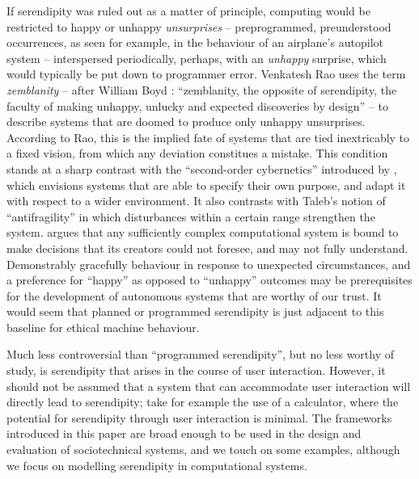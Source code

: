 If serendipity was ruled out as a matter of principle, computing would
be restricted to happy or unhappy \emph{unsurprises} -- preprogrammed,
preunderstood occurrences, as seen for example, in the behaviour of an
airplane's autopilot system -- interspersed periodically, perhaps,
with an \emph{unhappy} surprise, which would typically be put down to
programmer error.  Venkatesh Rao \citeyearpar{rao2015breaking} uses
the term \emph{zemblanity} -- after William Boyd
\citeyearpar{boyd2010armadillo}: ``zemblanity, the opposite of
serendipity, the faculty of making unhappy, unlucky and expected
discoveries by design'' -- to describe systems that are doomed to
produce only unhappy unsurprises.  According to Rao, this is the
implied fate of systems that are tied inextricably to a fixed vision,
from which any deviation constitues a mistake.  This condition stands
at a sharp contrast with the ``second-order cybernetics'' introduced
by , which envisions systems that are able
to specify their own purpose, and adapt it with respect to a wider
environment.  It also contrasts with Taleb's
\citeyearpar{taleb2012antifragile} notion of ``antifragility'' in
which disturbances within a certain range strengthen the system.
 argues that any sufficiently complex
computational system is bound to make decisions that its creators
could not foresee, and may not fully understand.  Demonstrably
gracefully behaviour in response to unexpected circumstances, and a
preference for ``happy'' as opposed to ``unhappy'' outcomes may be
prerequisites for the development of autonomous systems that are
worthy of our trust.  It would seem that planned or programmed
serendipity is just adjacent to this baseline for ethical machine
behaviour.

Much less controversial than ``programmed serendipity'', but no less
worthy of study, is serendipity that arises in the course of user
interaction.  However, it should not be assumed that a system that can
accommodate user interaction will directly lead to serendipity; take
for example the use of a calculator, where the potential for
serendipity through user interaction is minimal.  The frameworks
introduced in this paper are broad enough to be used in the design and
evaluation of sociotechnical systems, and we touch on some examples,
although we focus on modelling serendipity in computational systems.

